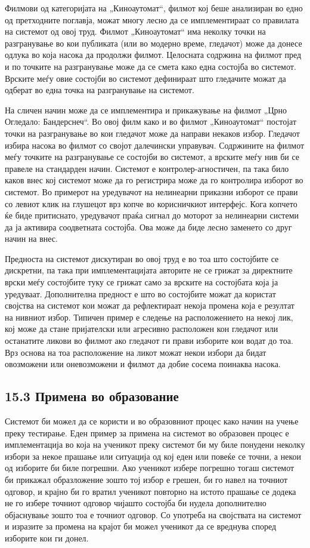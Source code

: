Филмови од категоријата на „Киноаутомат“, филмот кој беше анализиран во едно од претходните поглавја, можат многу лесно да се имплементираат со правилата на системот од овој труд. Филмот „Киноаутомат“ има неколку точки на разгранување во кои публиката (или во модерно време, гледачот) може да донесе одлука во која насока да продолжи филмот. Целосната содржина на филмот пред и по точките на разгранување може да се смета како една состојба во системот. Врските меѓу овие состојби во системот дефинираат што гледачите можат да одберат во една точка на разгранување на системот.

На сличен начин може да се имплементира и прикажување на филмот „Црно Огледало: Бандерснеч“. Во овој филм како и во филмот „Киноаутомат“ постојат точки на разгранување во кои гледачот може да направи некаков избор. Гледачот избира насока во филмот со својот далечински управувач. Содржините на филмот меѓу точките на разгранување се состојби во системот, а врските меѓу нив би се правеле на стандарден начин. Системот е контролер-агностичен, па така било каков внес кој системот може да го регистрира може да го контролира изборот во системот. Во примерот на уредувачот на нелинеарни приказни изборот се прави со левиот клик на глушецот врз копче во корисничкиот интерфејс. Кога копчето ќе биде притиснато, уредувачот праќа сигнал до моторот за нелинеарни системи да ја активира соодветната состојба. Ова може да биде лесно заменето со друг начин на внес.

Предноста на системот дискутиран во овој труд е во тоа што состојбите се дискретни, па така при имплементацијата авторите не се грижат за директните врски меѓу состојбите туку се грижат само за врските на состојбата која ја уредуваат. Дополнителна предност е што во состојбите можат да користат својства на системот кои можат да рефлектираат некоја промена која е резултат на нивниот избор. Типичен пример е следење на расположението на некој лик, кој може да стане пријателски или агресивно расположен кон гледачот или останатите ликови во филмот ако гледачот ги прави изборите кои водат до тоа. Врз основа на тоа расположение на ликот можат некои избори да бидат овозможени или оневозможени и филмот да добие сосема поинаква насока.

\subsection{15.3 Примена во образование}

Системот би можел да се користи и во образовниот процес како начин на учење преку тестирање. Еден пример за примена на системот во образовен процес е имплементација во која на ученикот преку системот би му биле понудени неколку избори за некое прашање или ситуација од кој еден или повеќе се точни, а некои од изборите би биле погрешни. Ако ученикот избере погрешно тогаш системот би прикажал образложение зошто тој избор е грешен, би го навел на точниот одговор, и крајно би го вратил ученикот повторно на истото прашање се додека не го избере точниот одговор чијашто состојба би нудела дополнително објаснување зошто тоа е точниот одговор. Со употреба на својствата на системот и изразите за промена на крајот би можел ученикот да се вреднува според изборите кои ги донел.

